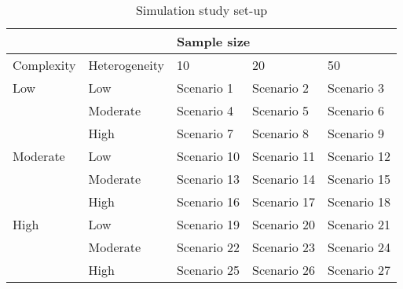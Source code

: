 \documentclass[a4paper, man, floatsintext]{apa6}
\begin{document}
\linebreak
\begin{table}[!h]
\caption{Simulation study set-up}
\begin{tabular}{@{}ll|lll@{}}
\toprule
           &               & \multicolumn{3}{l}{Sample size}         \\ \midrule
Complexity & Heterogeneity & 10          & 20          & 50          \\ \midrule
Low        & Low           & Scenario 1  & Scenario 2  & Scenario 3  \\
           & Moderate      & Scenario 4  & Scenario 5  & Scenario 6  \\
           & High          & Scenario 7  & Scenario 8  & Scenario 9  \\
Moderate   & Low           & Scenario 10 & Scenario 11 & Scenario 12 \\
           & Moderate      & Scenario 13 & Scenario 14 & Scenario 15 \\
           & High          & Scenario 16 & Scenario 17 & Scenario 18 \\
High       & Low           & Scenario 19 & Scenario 20 & Scenario 21 \\
           & Moderate      & Scenario 22 & Scenario 23 & Scenario 24 \\
           & High          & Scenario 25 & Scenario 26 & Scenario 27 \\ \bottomrule
\end{tabular}
\label{table:table1}
\end{table}



\end{document}
